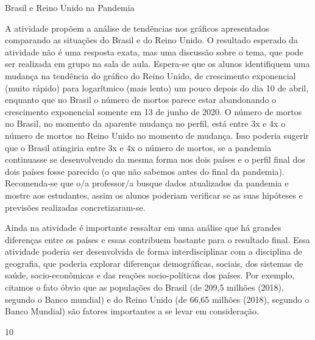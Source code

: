 \clearmargin
\begin{sugestions}{Brasil e Reino Unido na Pandemia}
{
	A atividade propõem a análise de tendências nos gráficos apresentados comparando as situações do Brasil e do Reino Unido. O resultado esperado da atividade não é uma resposta exata, mas uma discussão sobre o tema, que pode ser realizada em grupo na sala de aula. Espera-se que os alunos identifiquem uma mudança na tendência do gráfico do Reino Unido, de crescimento exponencial (muito rápido) para logarítmico (mais lento) um pouco depois do dia 10 de abril, enquanto que no Brasil o número de mortos parece estar abandonando o crescimento exponencial somente em 13 de junho de 2020. O número de mortos no Brasil, no momento da aparente mudança no perfil, está entre 3x e 4x o número de mortos no Reino Unido no momento de mudança. Isso poderia sugerir que o Brasil atingiria entre 3x e 4x o número de mortos, se a pandemia continuasse se  desenvolvendo da mesma forma nos dois países e o perfil final dos dois países fosse parecido (o que não sabemos antes do final da pandemia). Recomenda-se que o/a professor/a busque dados atualizados da pandemia e mostre aos estudantes, assim os alunos poderiam verificar se as suas hipóteses e previsões realizadas concretizaram-se.

	Ainda na atividade é importante ressaltar em uma análise que há grandes diferenças entre os países e essas contribuem bastante para o resultado final. Essa atividade poderia ser desenvolvida de forma interdisciplinar com a disciplina de geografia, que poderia explorar diferenças demográficas, sociais, dos sistemas de saúde, socio-econômicas e das reações socio-políticas dos países. Por exemplo, citamos o fato óbvio que as populações do Brasil (de 209,5 milhões (2018), segundo o Banco mundial) e do Reino Unido (de 66,65 milhões (2018), segundo o Banco Mundial) são fatores importantes a se levar em consideração.
}{1}{0}
\end{sugestions}

